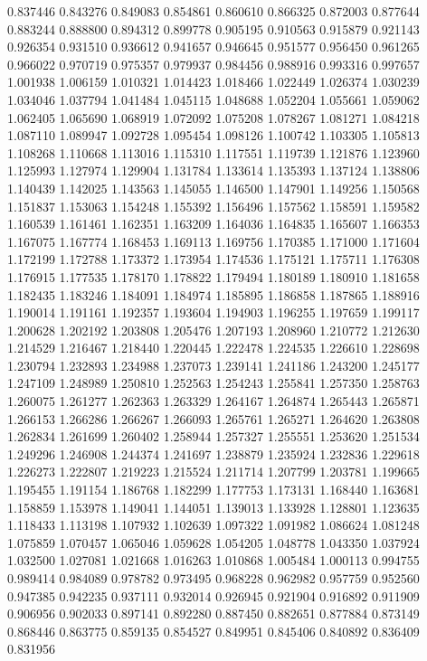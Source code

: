 0.837446
0.843276
0.849083
0.854861
0.860610
0.866325
0.872003
0.877644
0.883244
0.888800
0.894312
0.899778
0.905195
0.910563
0.915879
0.921143
0.926354
0.931510
0.936612
0.941657
0.946645
0.951577
0.956450
0.961265
0.966022
0.970719
0.975357
0.979937
0.984456
0.988916
0.993316
0.997657
1.001938
1.006159
1.010321
1.014423
1.018466
1.022449
1.026374
1.030239
1.034046
1.037794
1.041484
1.045115
1.048688
1.052204
1.055661
1.059062
1.062405
1.065690
1.068919
1.072092
1.075208
1.078267
1.081271
1.084218
1.087110
1.089947
1.092728
1.095454
1.098126
1.100742
1.103305
1.105813
1.108268
1.110668
1.113016
1.115310
1.117551
1.119739
1.121876
1.123960
1.125993
1.127974
1.129904
1.131784
1.133614
1.135393
1.137124
1.138806
1.140439
1.142025
1.143563
1.145055
1.146500
1.147901
1.149256
1.150568
1.151837
1.153063
1.154248
1.155392
1.156496
1.157562
1.158591
1.159582
1.160539
1.161461
1.162351
1.163209
1.164036
1.164835
1.165607
1.166353
1.167075
1.167774
1.168453
1.169113
1.169756
1.170385
1.171000
1.171604
1.172199
1.172788
1.173372
1.173954
1.174536
1.175121
1.175711
1.176308
1.176915
1.177535
1.178170
1.178822
1.179494
1.180189
1.180910
1.181658
1.182435
1.183246
1.184091
1.184974
1.185895
1.186858
1.187865
1.188916
1.190014
1.191161
1.192357
1.193604
1.194903
1.196255
1.197659
1.199117
1.200628
1.202192
1.203808
1.205476
1.207193
1.208960
1.210772
1.212630
1.214529
1.216467
1.218440
1.220445
1.222478
1.224535
1.226610
1.228698
1.230794
1.232893
1.234988
1.237073
1.239141
1.241186
1.243200
1.245177
1.247109
1.248989
1.250810
1.252563
1.254243
1.255841
1.257350
1.258763
1.260075
1.261277
1.262363
1.263329
1.264167
1.264874
1.265443
1.265871
1.266153
1.266286
1.266267
1.266093
1.265761
1.265271
1.264620
1.263808
1.262834
1.261699
1.260402
1.258944
1.257327
1.255551
1.253620
1.251534
1.249296
1.246908
1.244374
1.241697
1.238879
1.235924
1.232836
1.229618
1.226273
1.222807
1.219223
1.215524
1.211714
1.207799
1.203781
1.199665
1.195455
1.191154
1.186768
1.182299
1.177753
1.173131
1.168440
1.163681
1.158859
1.153978
1.149041
1.144051
1.139013
1.133928
1.128801
1.123635
1.118433
1.113198
1.107932
1.102639
1.097322
1.091982
1.086624
1.081248
1.075859
1.070457
1.065046
1.059628
1.054205
1.048778
1.043350
1.037924
1.032500
1.027081
1.021668
1.016263
1.010868
1.005484
1.000113
0.994755
0.989414
0.984089
0.978782
0.973495
0.968228
0.962982
0.957759
0.952560
0.947385
0.942235
0.937111
0.932014
0.926945
0.921904
0.916892
0.911909
0.906956
0.902033
0.897141
0.892280
0.887450
0.882651
0.877884
0.873149
0.868446
0.863775
0.859135
0.854527
0.849951
0.845406
0.840892
0.836409
0.831956
